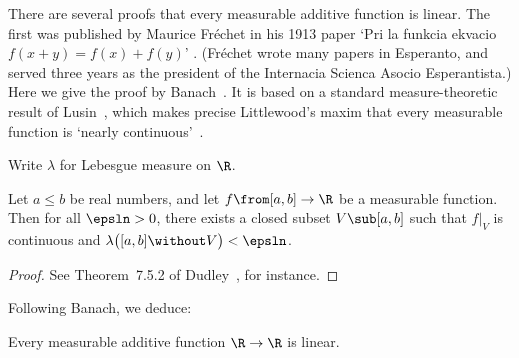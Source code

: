 There are several proofs that every measurable additive function is linear.
The first was published by Maurice%
%
%
Fr\'echet in his 1913 paper
`Pri la funkcia ekvacio $f(x + y) = f(x) + f(y)$' \cite{Frec}.  (Fr\'echet
wrote many papers in Esperanto,%
%
%
and served three years as the president of the Internacia Scienca Asocio
Esperantista.)  Here we give the proof by Banach~\cite{BanaSEF}.  It is
based on a standard measure-theoretic result of Lusin~\cite{Lusi}, which
makes precise Littlewood's%
%
%
maxim that every measurable function is `nearly continuous'~\cite{Litt}.

Write $\lambda$ for Lebesgue measure on $\R$.

\begin{thm}[Lusin]
Let $a \leq b$ be real numbers, and let $f \from [a, b] \to \R$ be a
measurable function.  Then for all $\epsln > 0$, there exists a closed
subset $V \sub [a, b]$ such that $f|_V$ is continuous and $\lambda\bigl(
[a, b] \without V \bigr) < \epsln$.
\end{thm}

\begin{proof}
See Theorem~7.5.2 of Dudley~\cite{Dudl}, for instance.
\end{proof}

Following Banach, we deduce:

\begin{thm}
Every measurable additive function $\R \to \R$ is linear.
\end{thm}

